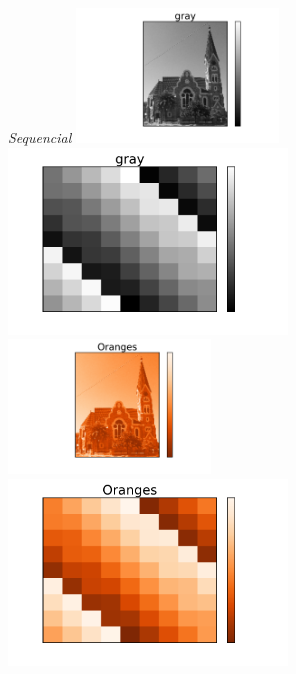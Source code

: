 \documentclass{beamer}
\begin{document}
\begin{frame}
\begin{columns}
\begin{column}{0.5\textwidth}
\begin{center}
\textit{Sequencial}
\vfill
\includegraphics[width=0.42\textwidth]{../church_gray.pdf}
\includegraphics[width=0.58\textwidth]{../magicsquare_gray.pdf}\newline\newline
\vfill
\includegraphics[width=0.42\textwidth]{../church_Oranges.pdf}
\includegraphics[width=0.58\textwidth]{../magicsquare_Oranges.pdf}
\vfill
\end{center}
\end{column}
\begin{column}{0.5\textwidth}

\end{column}
\end{columns}
\end{frame}
\end{document}
